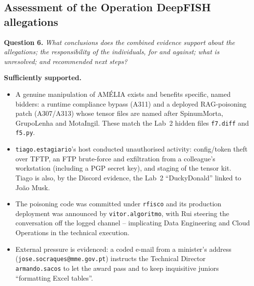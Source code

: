 \documentclass[11pt,a4paper,final,oneside]{article}
\begin{document}
\subsection{Assessment of the Operation DeepFISH allegations}
\label{sec:q6}

\textbf{Question 6.} \textit{What conclusions does the combined evidence support
about the allegations; the responsibility of the individuals, for and against;
what is unresolved; and recommended next steps?}

\textbf{Sufficiently supported.}
\begin{itemize}
  \item A genuine manipulation of AMÉLIA exists and benefits specific, named
  bidders: a runtime compliance bypass (A311) and a deployed RAG-poisoning patch
  (A307/A313) whose tensor files are named after SpinumMorta, GrupoLenha and
  MotaIngil. These match the Lab~2 hidden files \texttt{f7.diff} and \texttt{f5.py}.
  \item \texttt{tiago.estagiario}'s host conducted unauthorised activity:
  config/token theft over TFTP, an FTP brute-force and exfiltration from a
  colleague's workstation (including a PGP secret key), and staging of the tensor
  kit. Tiago is also, by the Discord evidence, the Lab~2 ``DuckyDonald'' linked to
  João Musk.
  \item The poisoning code was committed under \texttt{rfisco} and its production
  deployment was announced by \texttt{vitor.algoritmo}, with Rui steering the
  conversation off the logged channel -- implicating Data Engineering and Cloud
  Operations in the technical execution.
  \item External pressure is evidenced: a coded e-mail from a minister's address
  (\texttt{jose.socraques@mme.gov.pt}) instructs the Technical Director
  \texttt{armando.sacos} to let the award pass and to keep inquisitive juniors
  ``formatting Excel tables''.
\end{itemize}
\end{document}
